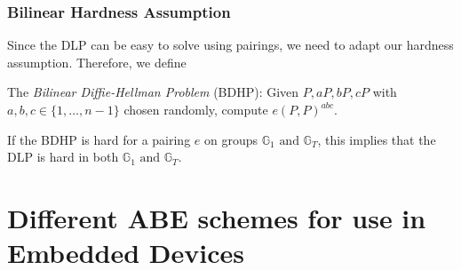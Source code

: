 \subsubsection{Bilinear Hardness Assumption}

Since the DLP can be easy to solve using pairings, we need to adapt our hardness assumption. Therefore, we define

The \emph{Bilinear Diffie-Hellman Problem} (BDHP): Given $P, aP, bP, cP$ with $a,b,c \in \{1,\dots,n-1\}$ chosen randomly, compute $e(P, P)^{abc}$.~\cite{menezes_introduction_2009}

If the BDHP is hard for a pairing $e$ on groups $\mathbb{G}_1 \text{ and } \mathbb{G}_T$, this implies that the DLP is hard in both $\mathbb{G}_1 \text{ and } \mathbb{G}_T$.~\cite{menezes_introduction_2009}

\section{Different ABE schemes for use in Embedded Devices}
